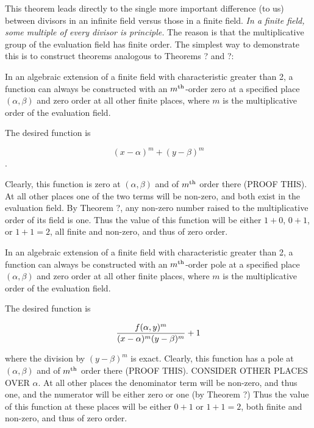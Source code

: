 \endtheorem

This theorem leads directly to the single more important difference
(to us) between divisors in an infinite field versus those in a finite
field.  {\it In a finite field, some multiple of every divisor is
principle.}  The reason is that the multiplicative group of the
evaluation field has finite order.  The simplest way to demonstrate
this is to construct theorems analogous to Theorems ? and ?:

\theorem

In an algebraic extension of a finite field with characteristic
greater than 2, a function can always be constructed with an $m^{\rm
th}$-order zero at a specified place $(\alpha, \beta)$ and zero order
at all other finite places, where $m$ is the multiplicative order of
the evaluation field.

\proof

The desired function is

$$(x-\alpha)^m + (y-\beta)^m$$.

Clearly, this function is zero at $(\alpha, \beta)$ and of $m^{\rm
th}$ order there (PROOF THIS).  At all other places one of the two
terms will be non-zero, and both exist in the evaluation field.  By
Theorem ?, any non-zero number raised to the multiplicative order of
its field is one.  Thus the value of this function will be either
$1+0$, $0+1$, or $1+1=2$, all finite and non-zero, and thus of zero
order.

\endtheorem

\theorem

In an algebraic extension of a finite field with characteristic
greater than 2, a function can always be constructed with an $m^{\rm
th}$-order pole at a specified place $(\alpha, \beta)$ and zero order
at all other finite places, where $m$ is the multiplicative order of
the evaluation field.

\proof

The desired function is

$${f(\alpha,y)^m\over(x-\alpha)^m(y-\beta)^m} + 1$$

where the division by $(y-\beta)^m$ is exact.
Clearly, this function has a pole at $(\alpha, \beta)$ and of $m^{\rm
th}$ order there (PROOF THIS).  CONSIDER OTHER PLACES OVER $\alpha$.
At all other places the denominator
term will be non-zero, and thus one, and the numerator will be
either zero or one (by Theorem ?)
Thus the value of this function at these places will be either
$0+1$ or $1+1=2$, both finite and non-zero, and thus of zero
order.

